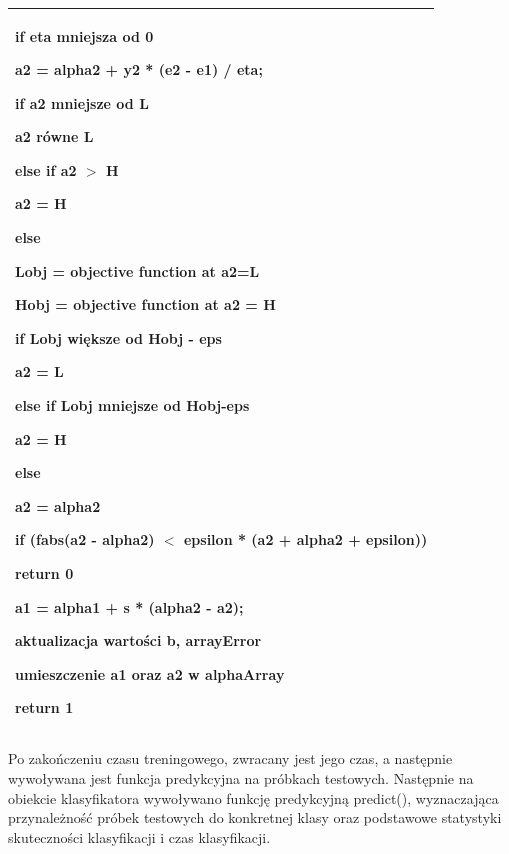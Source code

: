 \documentclass[[10pt,a4paper]{article}
\begin{document}
\begin{enumerate}
\begin{tabular}{|p{11.5cm}|}
\noindent \textbf{if }eta mniejsza od 0

 \hspace{1em}a2 = alpha2 + y2 * (e2 - e1) / eta;

 \hspace{1em}\textbf{if} a2 mniejsze od L

  \hspace{2em}a2 równe L

 \hspace{1em}\textbf{else if} a2 $>$ H

  \hspace{2em}a2 = H

\noindent \textbf{else}

 \hspace{1em}Lobj = objective function at a2=L

\hspace{1em} Hobj = objective function at a2 = H

 \hspace{1em}\textbf{if }Lobj większe od Hobj - eps

  \hspace{2em}a2 = L

 \hspace{1em}\textbf{else if} Lobj mniejsze od Hobj-eps

  \hspace{2em}a2 = H

 \hspace{1em}\textbf{else}

  \hspace{2em}a2 = alpha2

\noindent \textbf{if} (fabs(a2 - alpha2) $<$ epsilon * (a2 + alpha2 + epsilon)) 

  \hspace{1em}return 0

\noindent a1 = alpha1 + s * (alpha2 - a2); 

\noindent aktualizacja wartości b, arrayError

\noindent umieszczenie a1 oraz a2 w alphaArray

\noindent return 1

\noindent \textbf{}
\\ \hline
\end{tabular}

 Po zakończeniu czasu treningowego, zwracany jest jego czas, a następnie wywoływana jest funkcja predykcyjna na próbkach testowych. Następnie na obiekcie klasyfikatora wywoływano funkcję predykcyjną predict(), wyznaczająca przynależność próbek testowych do konkretnej klasy oraz podstawowe statystyki skuteczności klasyfikacji i czas klasyfikacji.


\end{enumerate}
\end{document}
